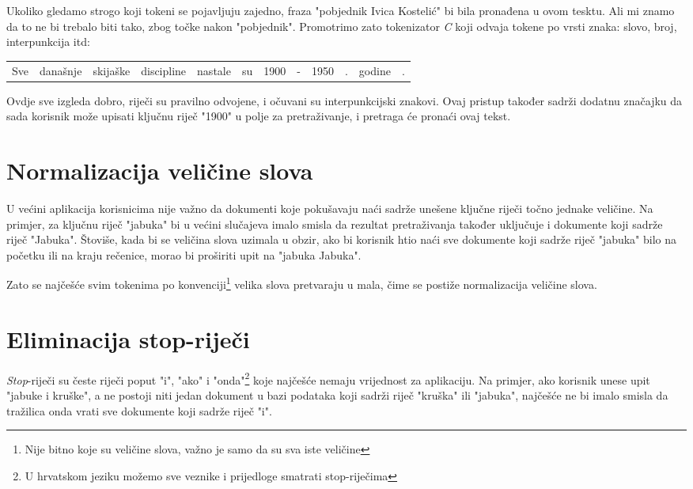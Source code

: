 \documentclass[11pt]{scrreprt}
\begin{document}
Ukoliko gledamo strogo koji tokeni se pojavljuju zajedno, fraza "pobjednik Ivica Kostelić" bi bila pronađena u ovom tesktu. Ali mi znamo da to ne bi trebalo biti tako, zbog točke nakon "pobjednik". Promotrimo zato tokenizator \textit{C} koji odvaja tokene po vrsti znaka: slovo, broj, interpunkcija itd:

\begin{center}
  \begin{tabular}{cccccccccccc}
    Sve & današnje & skijaške & discipline & nastale & su & 1900 & - & 1950 & . & godine & .
  \end{tabular}
\end{center}

Ovdje sve izgleda dobro, riječi su pravilno odvojene, i očuvani su interpunkcijski znakovi. Ovaj pristup također sadrži dodatnu značajku da sada korisnik može upisati ključnu riječ "1900" u polje za pretraživanje, i pretraga će pronaći ovaj tekst.

\section{Normalizacija veličine slova}

U većini aplikacija korisnicima nije važno da dokumenti koje pokušavaju naći sadrže unešene ključne riječi točno jednake veličine. Na primjer, za ključnu riječ "jabuka" bi u većini slučajeva imalo smisla da rezultat pretraživanja također uključuje i dokumente koji sadrže riječ "Jabuka". Štoviše, kada bi se veličina slova uzimala u obzir, ako bi korisnik htio naći sve dokumente koji sadrže riječ "jabuka" bilo na početku ili na kraju rečenice, morao bi proširiti upit na "jabuka Jabuka".

Zato se najčešće svim tokenima po konvenciji\footnote{Nije bitno koje su veličine slova, važno je samo da su sva iste veličine} velika slova pretvaraju u mala, čime se postiže normalizacija veličine slova.

\section{Eliminacija stop-riječi}

\textit{Stop}-riječi su česte riječi poput "i", "ako" i "onda"\footnote{U hrvatskom jeziku možemo sve veznike i prijedloge smatrati stop-riječima} koje najčešće nemaju vrijednost za aplikaciju. Na primjer, ako korisnik unese upit "jabuke i kruške", a ne postoji niti jedan dokument u bazi podataka koji sadrži riječ "kruška" ili "jabuka", najčešće ne bi imalo smisla da tražilica onda vrati sve dokumente koji sadrže riječ "i".
\end{document}
